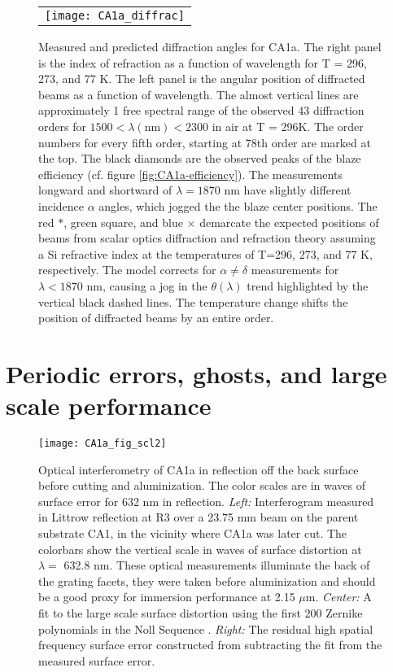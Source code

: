 \documentclass[]{spie}
\begin{document}
\begin{figure}
\begin{center}
 \begin{tabular}{c}
    \texttt{[image: CA1a\_diffrac]}
   \end{tabular}
  \end{center}
  \caption[CA1a Diffraction]{\label{fig:CA1a-diffrac} Measured and predicted diffraction angles for CA1a.  The right panel is the index of refraction as a function of wavelength\cite{frey2006} for T = 296, 273, and 77 K.  The left panel is the angular position of diffracted beams as a function of wavelength.  The almost vertical lines are approximately 1 free spectral range of the observed 43 diffraction orders for $1500 < \lambda (\textrm{nm}) < 2300$ in air at T = 296K.  The order numbers for every fifth order, starting at 78th order are marked at the top.  The black diamonds are the observed peaks of the blaze efficiency (cf. figure \ref{fig:CA1a-efficiency}).  The measurements longward and shortward of $\lambda=1870$ nm have slightly different incidence $\alpha$ angles, which jogged the the blaze center positions.  The red $\ast$, green square, and blue $\times$ demarcate the expected positions of beams from scalar optics diffraction and refraction theory assuming a Si refractive index at the temperatures of T=296, 273, and 77 K, respectively.  The model corrects for $\alpha \neq \delta$ measurements for $\lambda < 1870 $ nm, causing a jog in the $\theta(\lambda)$ trend highlighted by the vertical black dashed lines.  The temperature change shifts the position of diffracted beams by an entire order.}
\end{figure}

\section{Periodic errors, ghosts, and large scale performance} 

\begin{figure}
  \centering
\texttt{[image: CA1a\_fig\_scl2]}
  \caption{Optical interferometry of CA1a in reflection off the back surface before cutting and aluminization.  The color scales are in waves of surface error for 632 nm in reflection.  \emph{Left:} Interferogram measured in Littrow reflection at R3 over a 23.75 mm beam on the parent substrate CA1, in the vicinity where CA1a was later cut.  The colorbars show the vertical scale in waves of surface distortion at $\lambda = $ 632.8 nm.  These optical measurements illuminate the back of the grating facets, they were taken before aluminization and should be a good proxy for immersion performance at 2.15 $\mu$m. \emph{Center:} A fit to the large scale surface distortion using the first 200 Zernike polynomials in the Noll Sequence \cite{noll1976}.  \emph{Right:} The residual high spatial frequency surface error constructed from subtracting the fit from the measured surface error.}
  \label{fig:gram}
\end{figure}
\end{document}
